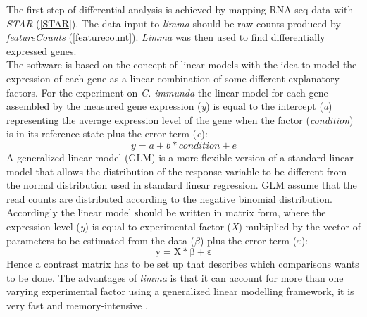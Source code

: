 \documentclass[12pt, a4paper]{report}
\newcommand{\HT}[1]{\textcolor{red}{#1}}
\begin{document}
The first step of differential analysis is achieved by mapping RNA-seq data with \textit{STAR} (\ref{STAR}). The data input to \textit{limma} should be raw counts produced by \textit{featureCounts} (\ref{featurecount}). %
\textit{Limma} was then used to find differentially expressed genes. \\
The software is based on the concept of linear models with the idea to model the expression of each gene as a linear combination of some different explanatory factors. For the experiment on \textit{C. immunda} the linear model for each gene assembled by the measured gene expression (\textit{y}) is equal to the intercept (\textit{a}) representing the average expression level of the gene when the factor (\textit{condition}) is in its reference state plus the error term (\textit{e}): 
\[y = a + b * condition + e\]
A generalized linear model (GLM) is a more flexible version of a standard linear model that allows the distribution of the response variable to be different from the normal distribution used in standard linear regression. GLM assume that the read counts are distributed according to the negative binomial distribution. 
Accordingly the linear model should be written in matrix form, where the expression level (\textit{y}) is equal to experimental factor (\textit{X}) multiplied by the vector of parameters to be estimated from the data ($\beta$) plus the error term ($\varepsilon$):
\[ \mathrm{ y = X * \beta + \varepsilon}\]
Hence a contrast matrix has to be set up that describes which comparisons wants to be done. The advantages of \textit{limma} is that it can account for more than one varying experimental factor using a generalized linear modelling framework, it is very fast and memory-intensive \cite{Ritchie2015}. 
\end{document}
